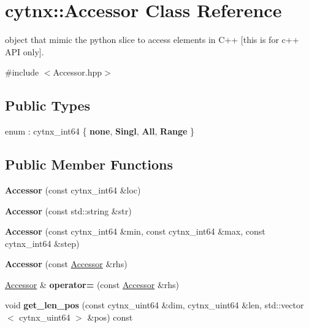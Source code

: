 \hypertarget{classcytnx_1_1Accessor}{}\section{cytnx\+:\+:Accessor Class Reference}
\label{classcytnx_1_1Accessor}


object that mimic the python slice to access elements in C++ \mbox{[}this is for c++ A\+PI only\mbox{]}.  




{\ttfamily \#include $<$Accessor.\+hpp$>$}

\subsection*{Public Types}
\begin{DoxyCompactItemize}
\item 
\mbox{\label{classcytnx_1_1Accessor_aae988b37daecd3e9564e507d1225f8ce}} 
enum \+: cytnx\+\_\+int64 \{ {\bfseries none}, 
{\bfseries Singl}, 
{\bfseries All}, 
{\bfseries Range}
 \}
\end{DoxyCompactItemize}
\subsection*{Public Member Functions}
\begin{DoxyCompactItemize}
\item 
\mbox{\label{classcytnx_1_1Accessor_a9f6fa9087f09756e020355a05196d384}} 
{\bfseries Accessor} (const cytnx\+\_\+int64 \&loc)
\item 
\mbox{\label{classcytnx_1_1Accessor_aefb1304726a9b229f3929e2b9d439602}} 
{\bfseries Accessor} (const std\+::string \&str)
\item 
\mbox{\label{classcytnx_1_1Accessor_ac0f2ae43a1a31db04ac9d4fafb70fea6}} 
{\bfseries Accessor} (const cytnx\+\_\+int64 \&min, const cytnx\+\_\+int64 \&max, const cytnx\+\_\+int64 \&step)
\item 
\mbox{\label{classcytnx_1_1Accessor_a6b7d3e3d7f2640ededbc207b468c8dc9}} 
{\bfseries Accessor} (const \hyperlink{classcytnx_1_1Accessor}{Accessor} \&rhs)
\item 
\mbox{\label{classcytnx_1_1Accessor_a0eb2fc1c85e7accff2078d85c8cf1cda}} 
\hyperlink{classcytnx_1_1Accessor}{Accessor} \& {\bfseries operator=} (const \hyperlink{classcytnx_1_1Accessor}{Accessor} \&rhs)
\item 
\mbox{\label{classcytnx_1_1Accessor_ad581c89553f55c4ce23de58e4499bdda}} 
void {\bfseries get\+\_\+len\+\_\+pos} (const cytnx\+\_\+uint64 \&dim, cytnx\+\_\+uint64 \&len, std\+::vector$<$ cytnx\+\_\+uint64 $>$ \&pos) const
\end{DoxyCompactItemize}
